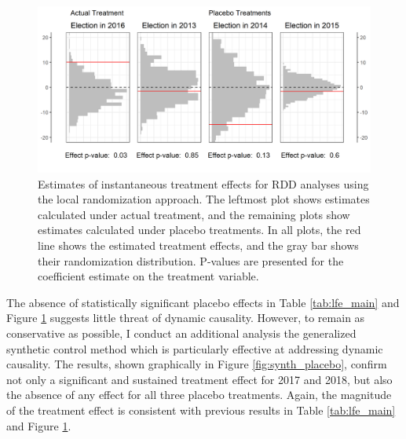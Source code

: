 \documentclass[12pt]{article}
\newcommand{\1}{\mathbbm{1}}
\begin{document}
\begin{figure}[!htbp]
	\centering
	\includegraphics[width=\textwidth]{figure/190529_rdd_results.png}
	\captionsetup{singlelinecheck=off}
	\caption[Estimated RDD treatment effects]{Estimates of instantaneous treatment effects for RDD analyses using the local randomization approach. The leftmost plot shows estimates calculated under actual treatment, and the remaining plots show estimates calculated under placebo treatments. In all plots, the red line shows the estimated treatment effects, and the gray bar shows their randomization distribution. P-values are presented for the coefficient estimate on the treatment variable.}
	\label{fig:rdd_placebo}
\end{figure}

The absence of statistically significant placebo effects in Table \ref{tab:lfe_main} and Figure \ref{fig:rdd_placebo} suggests little threat of dynamic causality. However, to remain as conservative as possible, I conduct an additional analysis the generalized synthetic control method \cite{Xu2017gsynth} which is particularly effective at addressing dynamic causality. The results, shown graphically in Figure \ref{fig:synth_placebo}, confirm not only a significant and sustained treatment effect for 2017 and 2018, but also the absence of any effect for all three placebo treatments. Again, the magnitude of the treatment effect is consistent with previous results in Table \ref{tab:lfe_main} and Figure \ref{fig:rdd_placebo}.
\end{document}
